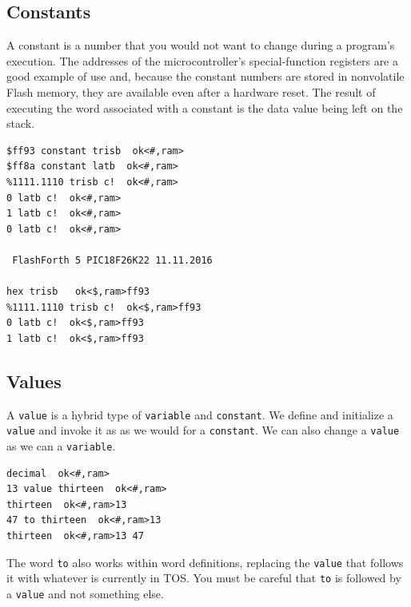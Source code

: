 \documentclass[12pt,a4paper]{article}
\begin{document}
\medskip
\subsection{Constants}
\label{sec:constants}
%
A constant is a number that you would not want to change during a program's execution.
The addresses of the microcontroller's special-function registers are a good example 
of use and, because the constant numbers are stored in nonvolatile Flash memory, they are
available even after a hardware reset.
The result of executing the word associated with a constant is the data value being left on the stack.
\begin{verbatim}
$ff93 constant trisb  ok<#,ram> 
$ff8a constant latb  ok<#,ram>
%1111.1110 trisb c!  ok<#,ram>
0 latb c!  ok<#,ram>
1 latb c!  ok<#,ram>
0 latb c!  ok<#,ram>

 FlashForth 5 PIC18F26K22 11.11.2016

hex trisb   ok<$,ram>ff93 
%1111.1110 trisb c!  ok<$,ram>ff93 
0 latb c!  ok<$,ram>ff93 
1 latb c!  ok<$,ram>ff93 
\end{verbatim}


\medskip
\subsection{Values}
\label{sec:values}
%
A \verb!value! is a hybrid type of \verb!variable! and \verb!constant!.
We define and initialize a \verb!value! and invoke it as as we would for a \verb!constant!.
We can also change a \verb!value! as we can a \verb!variable!.
\begin{verbatim}
decimal  ok<#,ram>
13 value thirteen  ok<#,ram>
thirteen  ok<#,ram>13 
47 to thirteen  ok<#,ram>13 
thirteen  ok<#,ram>13 47 
\end{verbatim}
The word \verb!to! also works within word definitions, replacing the \verb!value! that
follows it with whatever is currently in TOS.
You must be careful that \verb!to! is followed by a \verb!value! and not something else.


\medskip
\end{document}
